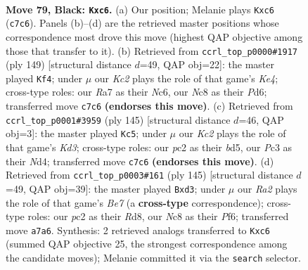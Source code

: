 \documentclass[11pt]{article}
\begin{document}
\clearpage

\begin{figure}[p]\centering
\begin{subfigure}{0.46\textwidth}\centering
\resizebox{\linewidth}{!}{%
\newchessgame
\chessboard[
  setfen={2n5/r1k5/P1P5/1R5p/8/2pBK1PP/2P5/8 b - - 4 79},
  showmover=false,
  pgfstyle=straightmove, color=movearrow, markmove={c7-c6}
]}
\caption{}
\end{subfigure}\hfill
\begin{subfigure}{0.46\textwidth}\centering
\resizebox{\linewidth}{!}{%
\newchessgame
\chessboard[
  setfen={2r5/8/2np2B1/4kPP1/7p/5P1K/8/6B1 b - - 2 75},
  showmover=false,
  pgfstyle=straightmove, color=movearrow, markmove={e5-f4}
]}
\caption{}
\end{subfigure}
\\[4pt]
\begin{subfigure}{0.46\textwidth}\centering
\resizebox{\linewidth}{!}{%
\newchessgame
\chessboard[
  setfen={8/8/3k1R2/3Br1p1/2Pn2Pp/7P/7K/8 b - - 6 73},
  showmover=false,
  pgfstyle=straightmove, color=movearrow, markmove={d6-c5}
]}
\caption{}
\end{subfigure}\hfill
\begin{subfigure}{0.46\textwidth}\centering
\resizebox{\linewidth}{!}{%
\newchessgame
\chessboard[
  setfen={3r4/4R3/3p1p2/3P1k2/B4P1p/3P4/4b1PK/8 b - - 1 73},
  showmover=false,
  pgfstyle=straightmove, color=movearrow, markmove={e2-d3}
]}
\caption{}
\end{subfigure}
\caption{\textbf{Move 79, Black: \texttt{Kxc6}.} (a) Our position; Melanie plays \texttt{Kxc6} (\texttt{c7c6}). Panels (b)--(d) are the retrieved master positions whose correspondence most drove this move (highest QAP objective among those that transfer to it). (b) Retrieved from \texttt{ccrl\_top\_p0000\#1917} (ply 149) [structural distance $d$=49, QAP obj=22]: the master played \texttt{Kf4}; under $\mu$ our \emph{Kc2} plays the role of that game's \emph{Ke4}; cross-type roles: our \emph{R}a7 as their \emph{N}c6, our \emph{N}c8 as their \emph{P}d6; transferred move \texttt{c7c6} \textbf{(endorses this move)}. (c) Retrieved from \texttt{ccrl\_top\_p0001\#3959} (ply 145) [structural distance $d$=46, QAP obj=3]: the master played \texttt{Kc5}; under $\mu$ our \emph{Kc2} plays the role of that game's \emph{Kd3}; cross-type roles: our \emph{p}c2 as their \emph{b}d5, our \emph{P}c3 as their \emph{N}d4; transferred move \texttt{c7c6} \textbf{(endorses this move)}. (d) Retrieved from \texttt{ccrl\_top\_p0003\#161} (ply 145) [structural distance $d$=49, QAP obj=39]: the master played \texttt{Bxd3}; under $\mu$ our \emph{Ra2} plays the role of that game's \emph{Be7} (a \textbf{cross-type} correspondence); cross-type roles: our \emph{p}c2 as their \emph{R}d8, our \emph{N}c8 as their \emph{P}f6; transferred move \texttt{a7a6}. Synthesis: 2 retrieved analogs transferred to \texttt{Kxc6} (summed QAP objective 25, the strongest correspondence among the candidate moves); Melanie committed it via the \texttt{search} selector.}
\label{fig:thought-m157}
\end{figure}
\end{document}
